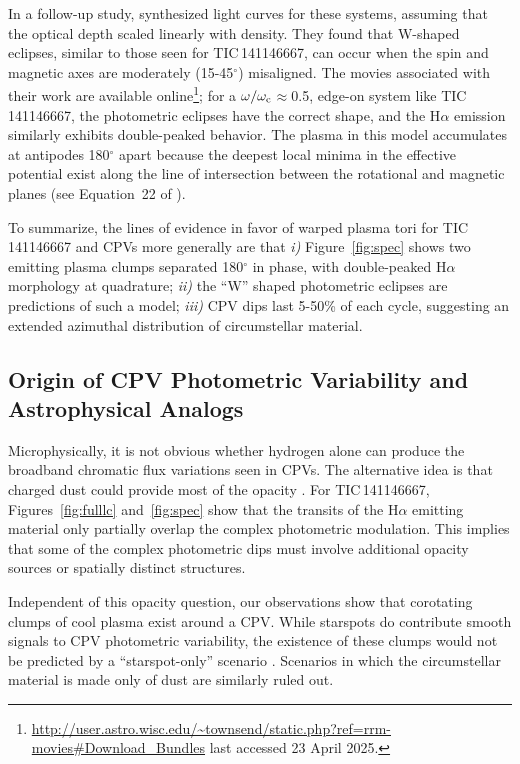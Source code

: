 \documentclass[11pt,twocolumn,tighten,linenumbers]{aastex7}
\begin{document}
In a follow-up study, \citet{Townsend2008} synthesized light curves for
these systems, assuming that the optical depth scaled linearly with
density.  They found that W-shaped eclipses, similar to those seen for
TIC\,141146667, can occur when the spin and magnetic axes are moderately
(15-45$^\circ$) misaligned.  The movies associated with their work are
available
online\footnote{\url{http://user.astro.wisc.edu/\~townsend/static.php?ref=rrm-movies\#Download\_Bundles}
last accessed 23 April 2025.}; for a $\omega/\omega_{\rm
c}$$\approx$0.5, edge-on system like TIC\,141146667, the photometric
eclipses have the correct shape, and the H$\alpha$ emission similarly
exhibits double-peaked behavior.  The plasma in this model accumulates
at antipodes 180$^\circ$ apart because the deepest local minima in the
effective potential exist along the line of intersection between the
rotational and magnetic planes (see Equation~22 of
\citealt{Townsend2005}).  

To summarize, the lines of evidence in favor of warped plasma tori for
TIC\,141146667 and CPVs more generally are that {\it i)}
Figure~\ref{fig:spec} shows two emitting plasma clumps separated
180$^\circ$ in phase, with double-peaked H$\alpha$ morphology at
quadrature; {\it ii)} the ``W'' shaped photometric eclipses are
predictions of such a model; {\it iii)} CPV dips last 5-50\% of each
cycle, suggesting an extended azimuthal distribution of circumstellar
material.

\subsection{Origin of CPV Photometric Variability and Astrophysical Analogs}

Microphysically, it is not obvious whether hydrogen alone can produce
the broadband chromatic flux variations seen in CPVs.  The
alternative idea is that charged dust could provide most of the
opacity \citep{Sanderson2023}.  For
TIC\,141146667, Figures~\ref{fig:fulllc}
and~\ref{fig:spec} show that the transits of the H$\alpha$ emitting
material only partially overlap the complex photometric modulation.
This implies that some of the complex photometric dips must involve
additional opacity sources or spatially distinct structures.

Independent of this opacity question, our observations show that
corotating clumps of cool plasma exist around a CPV.  While starspots do
contribute smooth signals to CPV photometric variability, the existence
of these clumps  would not be predicted by a ``starspot-only'' scenario
\citep{Koen2021}.  Scenarios in which the circumstellar material is made
only of dust are similarly ruled out.  
\end{document}
